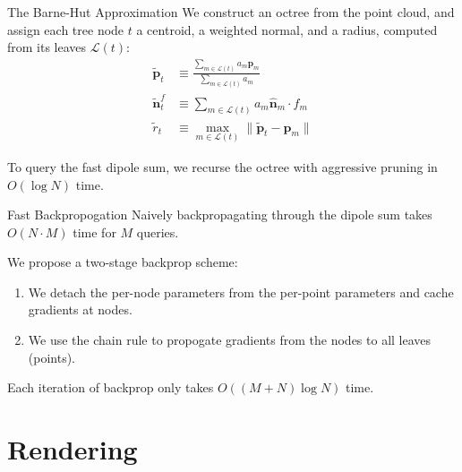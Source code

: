 \documentclass[10pt]{beamer}
\newcommand{\bp}{\mathbf{p}}
\newcommand{\bn}{\mathbf{n}}
\begin{document}
\begin{frame}{The Barne-Hut Approximation}
    We construct an \alert{octree} from the point cloud, and assign each tree node \(t\) a centroid, a weighted normal, and a radius, computed from its leaves \(\mathcal L(t)\):
    \begin{align*}
        \tilde{\bp}_t   & \equiv \frac{\sum_{m \in \mathcal L(t)} a_m \bp_m}{\sum_{m \in \mathcal L(t)} a_m} \\
        \tilde{\bn}^f_t & \equiv \sum_{m \in \mathcal L(t)} a_m \widehat{\bn}_m \cdot f_m                    \\
        \tilde{r}_t     & \equiv \max_{m \in \mathcal L(t)} \|\tilde{\bp}_t - \bp_m\|
    \end{align*}

    To query the \alert{fast} dipole sum, we recurse the octree with aggressive pruning in \(O(\log N)\) time.
\end{frame}

\begin{frame}{Fast Backpropogation}
    Naively backpropagating through the dipole sum takes \(O(N\cdot M)\) time for \(M\) queries.

    We propose a two-stage backprop scheme:
    \begin{enumerate}
        \item
              We \alert{detach} the per-node parameters from the per-point parameters and \alert{cache} gradients at nodes.
        \item
              We use the \alert{chain rule} to propogate gradients from the nodes to all leaves (points).
    \end{enumerate}

    Each iteration of backprop only takes \(O((M + N)\log N)\) time.
\end{frame}


\section{Rendering}
\end{document}
